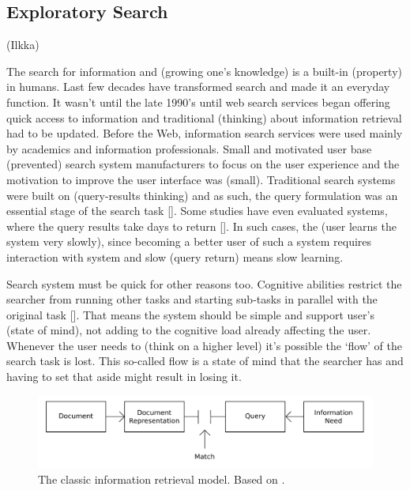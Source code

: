 \subsection{Exploratory Search}
(Ilkka)

The search for information and (growing one's knowledge) is a built-in (property) in humans. Last few decades have transformed search and made it an everyday function. It wasn't until the late 1990's until web search services began offering quick access to information and traditional (thinking) about information retrieval had to be updated. Before the Web, information search services were used mainly by academics and information professionals. Small and motivated user base (prevented) search system manufacturers to focus on the user experience and the motivation to improve the user interface was (small). Traditional search systems were built on (query-results thinking) and as such, the query formulation was an essential stage of the search task []. Some studies have even evaluated systems, where the query results take days to return []. In such cases, the (user learns the system very slowly), since becoming a better user of such a system requires interaction with system and slow (query return) means slow learning.

Search system must be quick for other reasons too. Cognitive abilities restrict the searcher from running other tasks and starting sub-tasks in parallel with the original task []. That means the system should be simple and support user's (state of mind), not adding to the cognitive load already affecting the user. Whenever the user needs to (think on a higher level) it's possible the ‘flow' of the search task is lost. This so-called flow is a state of mind that the searcher has and having to set that aside might result in losing it.

\begin{figure}[htp] %
\caption{The classic information retrieval model. Based on \protect\cite{bates89}.}
\label{figure_classicIR}
\centering
\includegraphics[scale=0.45]{figures/classicIR.pdf}
\end{figure}

